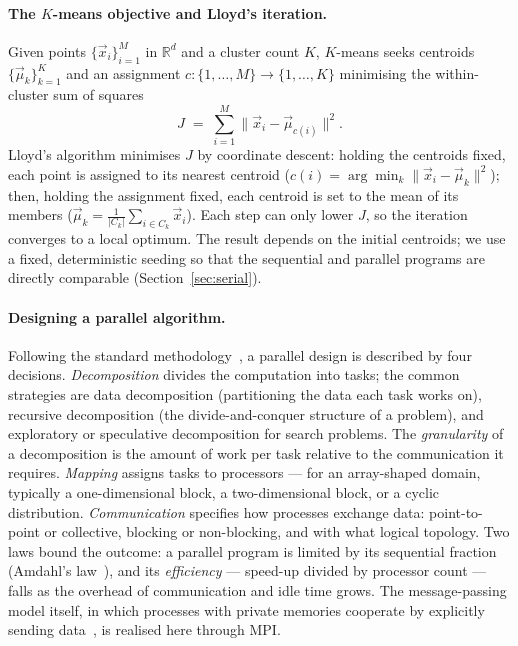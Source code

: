 \documentclass[11pt,a4paper]{article}
\begin{document}
\paragraph{The $K$-means objective and Lloyd's iteration.}
Given points $\{\vec x_i\}_{i=1}^{M}$ in $\mathbb{R}^{d}$ and a cluster count
$K$, $K$-means seeks centroids $\{\vec\mu_k\}_{k=1}^{K}$ and an assignment
$c:\{1,\dots,M\}\to\{1,\dots,K\}$ minimising the within-cluster sum of squares
\begin{equation}
\label{eq:objective}
J \;=\; \sum_{i=1}^{M}\bigl\lVert \vec x_i-\vec\mu_{c(i)}\bigr\rVert^{2}.
\end{equation}
Lloyd's algorithm minimises $J$ by coordinate descent: holding the centroids
fixed, each point is assigned to its nearest centroid
($c(i)=\arg\min_k\lVert\vec x_i-\vec\mu_k\rVert^2$); then, holding the
assignment fixed, each centroid is set to the mean of its members
($\vec\mu_k=\frac{1}{|C_k|}\sum_{i\in C_k}\vec x_i$). Each step can only lower
$J$, so the iteration converges to a local optimum. The result depends on the
initial centroids; we use a fixed, deterministic seeding so that the sequential
and parallel programs are directly comparable (Section~\ref{sec:serial}).

\paragraph{Designing a parallel algorithm.}
Following the standard methodology~\cite{grama2003,foster1995}, a parallel
design is described by four decisions. \emph{Decomposition} divides the
computation into tasks; the common strategies are data decomposition
(partitioning the data each task works on), recursive decomposition (the
divide-and-conquer structure of a problem), and exploratory or speculative
decomposition for search problems. The \emph{granularity} of a decomposition is
the amount of work per task relative to the communication it requires.
\emph{Mapping} assigns tasks to processors --- for an array-shaped domain,
typically a one-dimensional block, a two-dimensional block, or a cyclic
distribution. \emph{Communication} specifies how processes exchange data:
point-to-point or collective, blocking or non-blocking, and with what logical
topology. Two laws bound the outcome: a parallel program is limited by its
sequential fraction (Amdahl's law~\cite{amdahl1967}), and its
\emph{efficiency} --- speed-up divided by processor count --- falls as the
overhead of communication and idle time grows. The message-passing model
itself, in which processes with private memories cooperate by explicitly sending
data~\cite{quinn2004}, is realised here through MPI.
\end{document}
